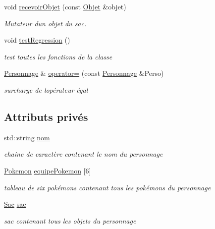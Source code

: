 \begin{DoxyCompactItemize}
void \hyperlink{class_personnage_a70fb0f0180dd625cf96dfc469ae5710e}{recevoir\+Objet} (const \hyperlink{class_objet}{Objet} \&objet)
\begin{DoxyCompactList}\small\item\em Mutateur d\textquotesingle{}un objet du sac. \end{DoxyCompactList}\item 
\mbox{\label{class_personnage_a8b827a72e42d38de1b6d29dee145a4b5}} 
void \hyperlink{class_personnage_a8b827a72e42d38de1b6d29dee145a4b5}{test\+Regression} ()
\begin{DoxyCompactList}\small\item\em test toutes les fonctions de la classe \end{DoxyCompactList}\item 
\hyperlink{class_personnage}{Personnage} \& \hyperlink{class_personnage_a6727627eb37382d3d8f12514551df9bd}{operator=} (const \hyperlink{class_personnage}{Personnage} \&Perso)
\begin{DoxyCompactList}\small\item\em surcharge de l\textquotesingle{}opérateur égal \end{DoxyCompactList}\end{DoxyCompactItemize}
\subsection*{Attributs privés}
\begin{DoxyCompactItemize}
\item 
\mbox{\label{class_personnage_a2fa5fc776898b5f501709d439cc1a81f}} 
std\+::string \hyperlink{class_personnage_a2fa5fc776898b5f501709d439cc1a81f}{nom}
\begin{DoxyCompactList}\small\item\em chaine de caractère contenant le nom du personnage \end{DoxyCompactList}\item 
\mbox{\label{class_personnage_a1df050fd3c57bd7548f3cc6a71d24478}} 
\hyperlink{class_pokemon}{Pokemon} \hyperlink{class_personnage_a1df050fd3c57bd7548f3cc6a71d24478}{equipe\+Pokemon} \mbox{[}6\mbox{]}
\begin{DoxyCompactList}\small\item\em tableau de six pokémons contenant tous les pokémons du personnage \end{DoxyCompactList}\item 
\mbox{\label{class_personnage_ace76f2960aae4315d034704670410ef2}} 
\hyperlink{class_sac}{Sac} \hyperlink{class_personnage_ace76f2960aae4315d034704670410ef2}{sac}
\begin{DoxyCompactList}\small\item\em sac contenant tous les objets du personnage \end{DoxyCompactList}\end{DoxyCompactItemize}


